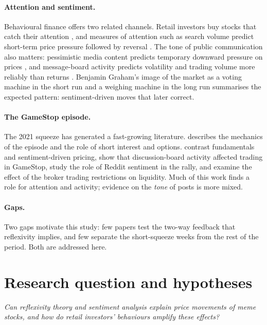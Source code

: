 \documentclass[11pt,a4paper]{article}
\begin{document}
\paragraph{Attention and sentiment.} Behavioural finance offers two related
channels. Retail investors buy stocks that catch their attention
\citep{barber2008}, and measures of attention such as search volume predict
short-term price pressure followed by reversal \citep{da2011}. The tone of
public communication also matters: pessimistic media content predicts temporary
downward pressure on prices \citep{tetlock2007}, and message-board activity
predicts volatility and trading volume more reliably than returns
\citep{antweiler2004}. Benjamin Graham's image of the market as a voting machine
in the short run and a weighing machine in the long run \citep{graham1949}
summarises the expected pattern: sentiment-driven moves that later correct.

\paragraph{The GameStop episode.} The 2021 squeeze has generated a fast-growing
literature. \citet{malz2021} describes the mechanics of the episode and the role
of short interest and options. \citet{umar2021} contrast fundamentals and
sentiment-driven pricing, \citet{betzer2022} show that discussion-board activity
affected trading in GameStop, \citet{long2022} study the role of Reddit sentiment
in the rally, and \citet{garvey2023} examine the effect of the broker trading
restrictions on liquidity. Much of this work finds a role for attention and
activity; evidence on the \emph{tone} of posts is more mixed.

\paragraph{Gaps.} Two gaps motivate this study: few papers test the two-way
feedback that reflexivity implies, and few separate the short-squeeze weeks from
the rest of the period. Both are addressed here.

\section{Research question and hypotheses}

\emph{Can reflexivity theory and sentiment analysis explain price movements of
meme stocks, and how do retail investors' behaviours amplify these effects?}
\end{document}
